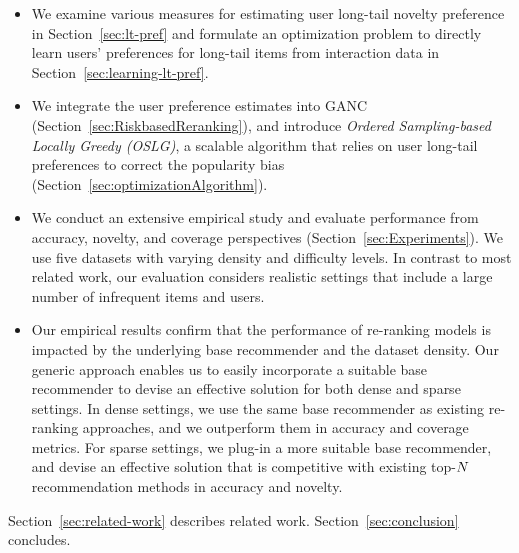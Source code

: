 \begin{itemize}

\item  We examine various measures for estimating user long-tail novelty preference in Section~\ref{sec:lt-pref} and formulate an optimization problem  to directly learn users' preferences for long-tail  items from interaction data in Section~\ref{sec:learning-lt-pref}. %

\item  We integrate the user preference estimates into GANC %
(Section~\ref{sec:RiskbasedReranking}), and  introduce {\it Ordered Sampling-based Locally Greedy (OSLG)\/}, a scalable algorithm that relies  on user long-tail preferences to correct the popularity bias (Section~\ref{sec:optimizationAlgorithm}).

\item   We conduct an extensive empirical study and evaluate performance from  accuracy, novelty, and coverage perspectives (Section~\ref{sec:Experiments}).  We use five  datasets with varying density and difficulty levels. %
  In contrast to most related work,  our evaluation considers realistic settings that include a large number of infrequent  items and users. %
 
\item Our empirical results confirm that the performance of re-ranking models is impacted by the underlying   base recommender and the dataset density. Our generic approach enables us to easily incorporate a suitable base recommender to devise an effective solution for both dense and sparse settings. In dense settings, we use the same base recommender as existing re-ranking approaches, and we outperform them in accuracy and coverage metrics. For sparse settings, we plug-in a more suitable base recommender, and devise an effective solution that is competitive with existing top-$N$ recommendation methods in accuracy and novelty. 

 
\end{itemize}

Section~\ref{sec:related-work} describes related work. Section~\ref{sec:conclusion} concludes.
